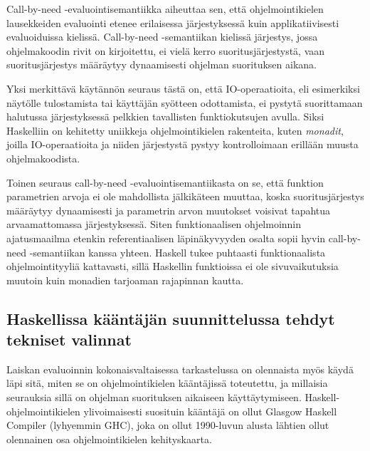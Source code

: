 Call-by-need -evaluointisemantiikka aiheuttaa sen, että ohjelmointikielen lausekkeiden evaluointi etenee erilaisessa järjestyksessä kuin applikatiivisesti evaluoiduissa kielissä. Call-by-need -semantiikan kielissä järjestys, jossa ohjelmakoodin rivit on kirjoitettu, ei vielä kerro suoritusjärjestystä, vaan suoritusjärjestys määräytyy dynaamisesti ohjelman suorituksen aikana.

Yksi merkittävä käytännön seuraus tästä on, että IO-operaatioita, eli esimerkiksi näytölle tulostamista tai käyttäjän syötteen odottamista, ei pystytä suorittamaan halutussa järjestyksessä pelkkien tavallisten funktiokutsujen avulla. Siksi Haskelliin on kehitetty uniikkeja ohjelmointikielen rakenteita, kuten \textit{monadit}, joilla IO-operaatioita ja niiden järjestystä pystyy kontrolloimaan erillään muusta ohjelmakoodista.

Toinen seuraus call-by-need -evaluointisemantiikasta on se, että funktion parametrien arvoja ei ole mahdollista jälkikäteen muuttaa, koska suoritusjärjestys määräytyy dynaamisesti ja parametrin arvon muutokset voisivat tapahtua arvaamattomassa järjestyksessä. Siten funktionaalisen ohjelmoinnin ajatusmaailma etenkin referentiaalisen läpinäkyvyyden osalta sopii hyvin call-by-need -semantiikan kanssa yhteen. Haskell tukee puhtaasti funktionaalista ohjelmointityyliä kattavasti, sillä Haskellin funktioissa ei ole sivuvaikutuksia muutoin kuin monadien tarjoaman rajapinnan kautta.

\subsection{Haskellissa kääntäjän suunnittelussa tehdyt tekniset valinnat}

Laiskan evaluoinnin kokonaisvaltaisessa tarkastelussa on olennaista myös käydä läpi sitä, miten se on ohjelmointikielen kääntäjissä toteutettu, ja millaisia seurauksia sillä on ohjelman suorituksen aikaiseen käyttäytymiseen. Haskell-ohjelmointikielen ylivoimaisesti suosituin kääntäjä on ollut Glasgow Haskell Compiler (lyhyemmin GHC), joka on ollut 1990-luvun alusta lähtien ollut olennainen osa ohjelmointikielen kehityskaarta.

